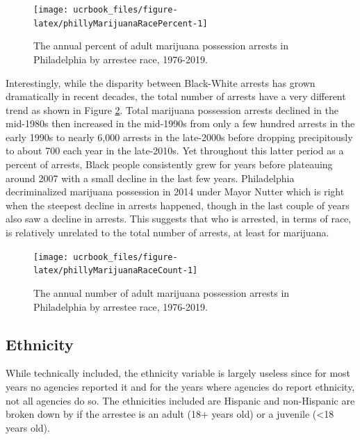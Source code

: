 \documentclass[
  12pt,
  openany]{book}
\begin{document}
\begin{figure}

{\centering \texttt{[image: ucrbook\_files/figure-latex/phillyMarijuanaRacePercent-1]} 

}

\caption{The annual percent of adult marijuana possession arrests in Philadelphia by arrestee race, 1976-2019.}\label{fig:phillyMarijuanaRacePercent}
\end{figure}

Interestingly, while the disparity between Black-White arrests has grown dramatically in recent decades, the total number of arrests have a very different trend as shown in Figure \ref{fig:phillyMarijuanaRaceCount}. Total marijuana possession arrests declined in the mid-1980s then increased in the mid-1990s from only a few hundred arrests in the early 1990s to nearly 6,000 arrests in the late-2000s before dropping precipitously to about 700 each year in the late-2010s. Yet throughout this latter period as a percent of arrests, Black people consistently grew for years before plateauing around 2007 with a small decline in the last few years. Philadelphia decriminalized marijuana possession in 2014 under Mayor Nutter which is right when the steepest decline in arrests happened, though in the last couple of years also saw a decline in arrests. This suggests that who is arrested, in terms of race, is relatively unrelated to the total number of arrests, at least for marijuana.

\begin{figure}

{\centering \texttt{[image: ucrbook\_files/figure-latex/phillyMarijuanaRaceCount-1]} 

}

\caption{The annual number of adult marijuana possession arrests in Philadelphia by arrestee race, 1976-2019.}\label{fig:phillyMarijuanaRaceCount}
\end{figure}

\hypertarget{ethnicity}{%
\subsection{Ethnicity}\label{ethnicity}}

While technically included, the ethnicity variable is largely useless since for most years no agencies reported it and for the years where agencies do report ethnicity, not all agencies do so. The ethnicities included are Hispanic and non-Hispanic are broken down by if the arrestee is an adult (18+ years old) or a juvenile (\textless18 years old).
\end{document}
